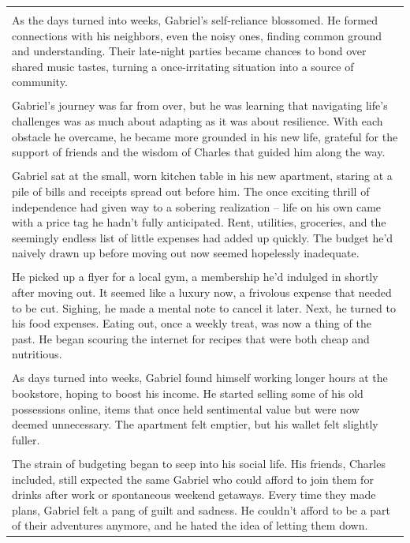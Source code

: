 \begin{small}
\begin{longtable}{p{}}
\\
\\
As the days turned into weeks, Gabriel's self-reliance blossomed. He formed connections with his neighbors, even the noisy ones, finding common ground and understanding. Their late-night parties became chances to bond over shared music tastes, turning a once-irritating situation into a source of community.
\\
\\
Gabriel's journey was far from over, but he was learning that navigating life's challenges was as much about adapting as it was about resilience. With each obstacle he overcame, he became more grounded in his new life, grateful for the support of friends and the wisdom of Charles that guided him along the way.
\\
\\
Gabriel sat at the small, worn kitchen table in his new apartment, staring at a pile of bills and receipts spread out before him. The once exciting thrill of independence had given way to a sobering realization – life on his own came with a price tag he hadn't fully anticipated. Rent, utilities, groceries, and the seemingly endless list of little expenses had added up quickly. The budget he'd naively drawn up before moving out now seemed hopelessly inadequate.
\\
\\
He picked up a flyer for a local gym, a membership he'd indulged in shortly after moving out. It seemed like a luxury now, a frivolous expense that needed to be cut. Sighing, he made a mental note to cancel it later. Next, he turned to his food expenses. Eating out, once a weekly treat, was now a thing of the past. He began scouring the internet for recipes that were both cheap and nutritious.
\\
\\
As days turned into weeks, Gabriel found himself working longer hours at the bookstore, hoping to boost his income. He started selling some of his old possessions online, items that once held sentimental value but were now deemed unnecessary. The apartment felt emptier, but his wallet felt slightly fuller.
\\
\\
The strain of budgeting began to seep into his social life. His friends, Charles included, still expected the same Gabriel who could afford to join them for drinks after work or spontaneous weekend getaways. Every time they made plans, Gabriel felt a pang of guilt and sadness. He couldn't afford to be a part of their adventures anymore, and he hated the idea of letting them down.

\end{longtable}
\end{small}
